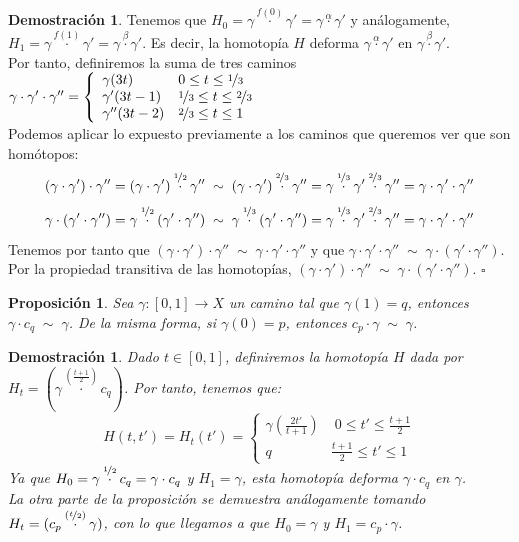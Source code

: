 \documentclass[12pt,twoside]{report}
\theoremstyle{azul}
\newtheorem*{propx}{Proposición}
\newtheorem*{demx}{Demostración}
\theoremstyle{azul2}
\theoremstyle{plain}
\theoremstyle{definition}
\newtheorem*{dem}{Demostración}
\theoremstyle{remark}
\begin{document}
\begin{dem}
Tenemos que $H_0=\gamma \stackrel{f(0)}{\cdot} \gamma'=\gamma \stackrel{\alpha}{\cdot} \gamma'  $ y análogamente, $H_1=\gamma \stackrel{f(1)}{\cdot} \gamma'=\gamma \stackrel{\beta}{\cdot} \gamma' $. Es decir, la homotopía $H$ deforma $\gamma \stackrel{\alpha}{\cdot} \gamma'$ en $\gamma \stackrel{\beta}{\cdot} \gamma'$.\\
Por tanto, definiremos la suma de tres caminos $\gamma \cdot \gamma' \cdot \gamma''=\left\{ \begin{array}{ll}
     \gamma(3t) & 0 \leq t \leq \nicefrac{1}{3}  \\
     \gamma'(3t-1) & \nicefrac{1}{3} \leq t \leq \nicefrac{2}{3} \\
     \gamma''(3t-2) & \nicefrac{2}{3} \leq t \leq 1
\end{array} \right.$\\
Podemos aplicar lo expuesto previamente a los caminos que queremos ver que son homótopos:
$$(\gamma \cdot \gamma') \cdot \gamma'' = (\gamma \cdot \gamma') \overset{\nicefrac{1}{2}}{\cdot} \gamma'' \; \sim \; (\gamma \cdot \gamma') \overset{\nicefrac{2}{3}}{\cdot} \gamma''= \gamma \overset{\nicefrac{1}{3}}{\cdot} \gamma' \overset{\nicefrac{2}{3}}{\cdot} \gamma''=\gamma \cdot \gamma' \cdot \gamma'' $$
$$\gamma \cdot (\gamma' \cdot \gamma'') = \gamma \overset{\nicefrac{1}{2}}{\cdot} (\gamma' \cdot \gamma'') \; \sim \; \gamma \overset{\nicefrac{1}{3}}{\cdot} (\gamma' \cdot \gamma'') = \gamma \overset{\nicefrac{1}{3}}{\cdot} \gamma' \overset{\nicefrac{2}{3}}{\cdot} \gamma''=\gamma \cdot \gamma' \cdot \gamma'' $$
Tenemos por tanto que $(\gamma \cdot \gamma') \cdot \gamma'' \; \sim \; \gamma \cdot \gamma' \cdot \gamma''$ y que $\gamma \cdot \gamma' \cdot \gamma'' \; \sim \; \gamma \cdot (\gamma' \cdot \gamma'')$. Por la propiedad transitiva de las homotopías, $(\gamma \cdot \gamma') \cdot \gamma'' \; \sim \; \gamma \cdot (\gamma' \cdot \gamma'')$. \hfill $\square$
\end{dem}

\begin{propx}
Sea $\gamma: [0,1] \longrightarrow X$ un camino tal que $\gamma(1)=q$, entonces $\gamma \cdot c_q \; \sim \; \gamma$. De la misma forma, si $\gamma(0) = p$, entonces $c_p \cdot \gamma \; \sim \; \gamma$.
\end{propx}
\begin{demx}
Dado $t \in [0,1]$, definiremos la homotopía $H$ dada por $H_t = (\gamma \overset{\left(\frac{t+1}{2}\right)}{\cdot} c_q)$. Por tanto, tenemos que:$$H(t,t') = H_t(t') = \left\{\begin{array}{ll}
     \gamma\left(\frac{2t'}{t + 1}\right) & \; 0 \leq t' \leq \frac{t+1}{2}  \\
     q & \frac{t+1}{2} \leq t' \leq 1
\end{array} \right.$$
Ya que $H_0 = \gamma \overset{\nicefrac{1}{2}}{\cdot} c_q = \gamma \cdot c_q$ y $H_1 = \gamma$, esta homotopía deforma $\gamma \cdot c_q$ en $\gamma$.\\
La otra parte de la proposición se demuestra análogamente tomando $H_t = (c_p \overset{\left(\nicefrac{t}{2}\right)}{\cdot} \gamma)$, con lo que llegamos a que $H_0 = \gamma$ y $H_1 = c_p \cdot \gamma$.
\end{demx}
\end{document}
